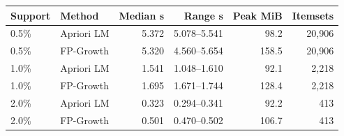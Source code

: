 \begin{tabular}{llrrrr}
\toprule
Support & Method & Median s & Range s & Peak MiB & Itemsets \\
\midrule
0.5\% & Apriori LM & 5.372 & 5.078--5.541 & 98.2 & 20,906 \\
0.5\% & FP-Growth & 5.320 & 4.560--5.654 & 158.5 & 20,906 \\
1.0\% & Apriori LM & 1.541 & 1.048--1.610 & 92.1 & 2,218 \\
1.0\% & FP-Growth & 1.695 & 1.671--1.744 & 128.4 & 2,218 \\
2.0\% & Apriori LM & 0.323 & 0.294--0.341 & 92.2 & 413 \\
2.0\% & FP-Growth & 0.501 & 0.470--0.502 & 106.7 & 413 \\
\bottomrule
\end{tabular}
